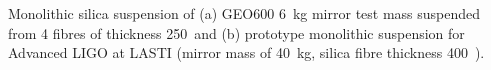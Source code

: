 \label{figure:monolithic}
Monolithic silica suspension of (a) GEO600 6~kg mirror test mass
suspended from 4 fibres of thickness 250~\mum and (b) prototype monolithic
suspension for Advanced LIGO at LASTI (mirror mass of 40~kg, silica fibre
thickness 400~\mum).